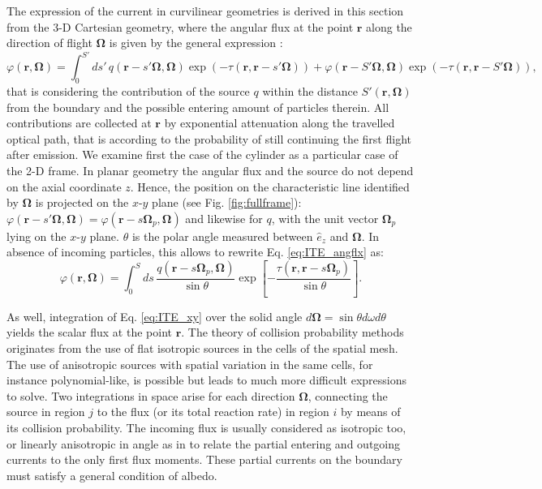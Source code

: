 \documentclass{ictt26}
\begin{document}
The expression of the current in curvilinear geometries is derived in this section from the 3-D Cartesian geometry, where the angular flux at the point $\mathbf{r}$ along the direction of flight $\mathbf{\Omega}$ is given by the general expression \cite{lewis1984computational}:
\begin{equation}
\varphi(\mathbf{r}, \mathbf{\Omega}) = \int_0^{S'}{ds'\, q(\mathbf{r} - s' \mathbf{\Omega}, \mathbf{\Omega}) \exp(-\tau(\mathbf{r}, \mathbf{r} - s' \mathbf{\Omega}))} + \varphi(\mathbf{r} - S' \mathbf{\Omega}, \mathbf{\Omega}) \exp(-\tau(\mathbf{r}, \mathbf{r} - S' \mathbf{\Omega})),
\label{eq:ITE_angflx}
\end{equation}
that is considering the contribution of the source $q$ within the distance $S'(\mathbf{r}, \mathbf{\Omega})$ from the boundary and the possible entering amount of particles therein. All contributions are collected at $\mathbf{r}$ by exponential attenuation along the travelled optical path, that is according to the probability of still continuing the first flight after emission. We examine first the case of the cylinder as a particular case of the 2-D frame. In planar geometry the angular flux and the source do not depend on the axial coordinate $z$. Hence, the position on the characteristic line identified by $\mathbf{\Omega}$ is projected on the $x$-$y$ plane (see Fig. \ref{fig:fullframe}): $\varphi(\mathbf{r} - s' \mathbf{\Omega},\mathbf{\Omega}) =\allowbreak \varphi(\mathbf{r} - s \mathbf{\Omega}_p,\mathbf{\Omega})$ and likewise for $q$, with the unit vector $\mathbf{\Omega}_p$ lying on the $x$-$y$ plane. $\theta$ is the polar angle measured between $\hat{e}_z$ and $\mathbf{\Omega}$. In absence of incoming particles, this allows to rewrite Eq. \ref{eq:ITE_angflx} as:
\begin{equation}
\varphi(\mathbf{r}, \mathbf{\Omega}) = \int_0^S{ds\, \frac{q(\mathbf{r} - s \mathbf{\Omega}_p, \mathbf{\Omega})}{\sin \theta} \exp \left[ -\frac{\tau(\mathbf{r}, \mathbf{r} - s \mathbf{\Omega}_p)}{\sin \theta} \right]}. %
\label{eq:ITE_xy}
\end{equation}

As well, integration of Eq. \ref{eq:ITE_xy} over the solid angle $d\mathbf{\Omega} = \sin \theta d\omega d \theta$ yields the scalar flux at the point $\mathbf{r}$. The theory of collision probability methods originates from the use of flat isotropic sources in the cells of the spatial mesh. The use of anisotropic sources with spatial variation in the same cells, for instance polynomial-like, is possible but leads to much more difficult expressions to solve. Two integrations in space arise for each direction $\mathbf{\Omega}$, connecting the source in region $j$ to the flux (or its total reaction rate) in region $i$ by means of its collision probability. The incoming flux is usually considered as isotropic too, or linearly anisotropic in angle as in \cite{hebert2009applied} to relate the partial entering and outgoing currents to the only first flux moments. These partial currents on the boundary must satisfy a general condition of albedo.
\end{document}
